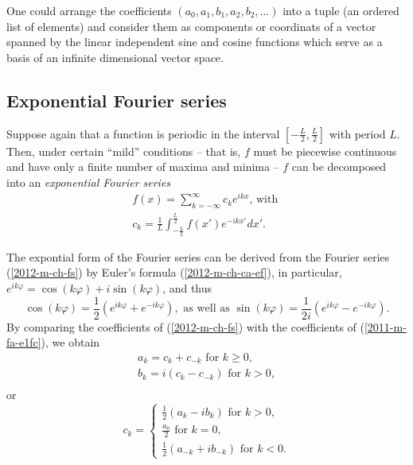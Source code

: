 One could arrange the coefficients
$(a_0,a_1,b_1,a_2,b_2, \ldots)$
into a tuple (an ordered list of elements)
and consider them as components or coordinats of a vector spanned by the
linear independent sine and cosine functions which serve as a basis of an infinite
dimensional vector space.



\subsection{Exponential Fourier series}




Suppose again that a function is periodic in the interval $[-\frac{L}{2},\frac{L}{2}]$
with period $L$.
Then, under certain ``mild'' conditions
-- that is, $f$ must be piecewise continuous and have only a finite number of maxima and minima --
$f$ can be decomposed  into an {\em exponential Fourier series}
\begin{equation}
\begin{array}{l}
f(x)= \sum _{k=-\infty}^\infty c_k e^{ikx} \textrm{, with } \\
c_k=\frac{1}{L}\int_{-\frac{L}{2}}^{\frac{L}{2}} f(x') e^{-ikx'} dx'.
\end{array}
\label{2011-m-fa-e1fc}
\end{equation}

The expontial form of the Fourier series
can be derived from the Fourier series (\ref{2012-m-ch-fs}) by
Euler's formula  (\ref{2012-m-ch-ca-ef}), in particular,
$e^{ik\varphi} = \cos (k\varphi )+i \sin (k\varphi )$, and thus
$$
\cos (k\varphi ) =\frac{1}{2}\left(e^{ik\varphi}+e^{-ik\varphi}\right)
,\textrm{ as well as }
\sin (k\varphi ) =\frac{1}{2i}\left(e^{ik\varphi}-e^{-ik\varphi} \right)
.
$$
By comparing the coefficients of (\ref{2012-m-ch-fs}) with the coefficients of (\ref{2011-m-fa-e1fc}),
we obtain
\begin{equation}
\begin{array}{l}
a_k= c_k+c_{-k} \textrm{ for } k \ge 0,\\
b_k= i(c_k-c_{-k})\textrm{ for } k > 0  ,\\
\end{array}
\label{2011-m-fa-e1fccc1}
\end{equation}
or
\begin{equation}
c_k=
\left\{
\begin{array}{l}
\frac{1}{2}(a_k-ib_k) \textrm{ for } k > 0,\\
\frac{a_0}{2} \textrm{ for } k = 0,\\
\frac{1}{2}(a_{-k}+ib_{-k}) \textrm{ for } k < 0.
\end{array}
\right.
\label{2011-m-fa-e1fccc2}
\end{equation}

